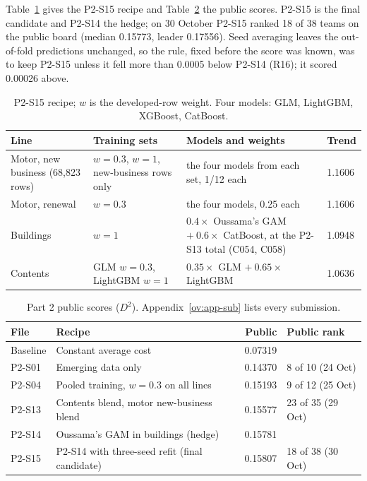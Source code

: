 Table~\ref{ov:tab-recipe} gives the P2-S15 recipe and Table~\ref{ov:tab-p2} the public scores. P2-S15 is the final
candidate and P2-S14 the hedge; on 30 October P2-S15 ranked 18 of 38 teams on the public board (median 0.15773, leader
0.17556). Seed averaging leaves the out-of-fold predictions unchanged, so the rule, fixed before the score was known,
was to keep P2-S15 unless it fell more than 0.0005 below P2-S14 (R16); it scored 0.00026 above.

\begin{table}[h]
\centering
\small
\begin{tabular}{p{3.1cm}p{3.6cm}p{6.6cm}l}
\hline
Line & Training sets & Models and weights & Trend\\
\hline
Motor, new business (68,823 rows) & $w = 0.3$, $w = 1$, new-business rows only & the four models from each set, 1/12 each & 1.1606\\
Motor, renewal & $w = 0.3$ & the four models, 0.25 each & 1.1606\\
Buildings & $w = 1$ & $0.4\times$ Oussama's GAM $+\ 0.6\times$ CatBoost, at the P2-S13 total (C054, C058) & 1.0948\\
Contents & GLM $w = 0.3$, LightGBM $w = 1$ & $0.35\times$ GLM $+\ 0.65\times$ LightGBM & 1.0636\\
\hline
\end{tabular}
\caption{P2-S15 recipe; $w$ is the developed-row weight. Four models: GLM, LightGBM, XGBoost, CatBoost.}
\label{ov:tab-recipe}
\end{table}

\begin{table}[h]
\centering
\small
\begin{tabular}{llrl}
\hline
File & Recipe & Public & Public rank\\
\hline
Baseline & Constant average cost & 0.07319 & \\
P2-S01 & Emerging data only & 0.14370 & 8 of 10 (24 Oct)\\
P2-S04 & Pooled training, $w = 0.3$ on all lines & 0.15193 & 9 of 12 (25 Oct)\\
P2-S13 & Contents blend, motor new-business blend & 0.15577 & 23 of 35 (29 Oct)\\
P2-S14 & Oussama's GAM in buildings (hedge) & 0.15781 & \\
P2-S15 & P2-S14 with three-seed refit (final candidate) & 0.15807 & 18 of 38 (30 Oct)\\
\hline
\end{tabular}
\caption{Part 2 public scores ($D^2$). Appendix~\ref{ov:app-sub} lists every submission.}
\label{ov:tab-p2}
\end{table}

